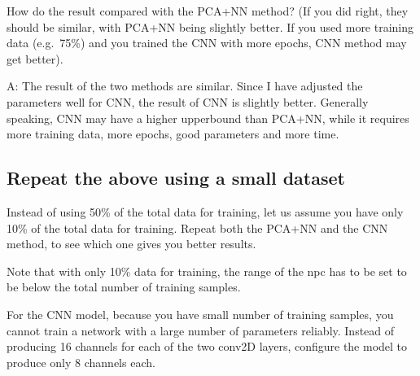 \documentclass[11pt]{article}
\begin{document}
    How do the result compared with the PCA+NN method? (If you did right,
they should be similar, with PCA+NN being slightly better. If you used
more training data (e.g.~75\%) and you trained the CNN with more epochs,
CNN method may get better).

    A: The result of the two methods are similar. Since I have adjusted the
parameters well for CNN, the result of CNN is slightly better. Generally
speaking, CNN may have a higher upperbound than PCA+NN, while it
requires more training data, more epochs, good parameters and more time.

    \hypertarget{repeat-the-above-using-a-small-dataset}{%
\subsection{Repeat the above using a small
dataset}\label{repeat-the-above-using-a-small-dataset}}

Instead of using 50\% of the total data for training, let us assume you
have only 10\% of the total data for training. Repeat both the PCA+NN
and the CNN method, to see which one gives you better results.

Note that with only 10\% data for training, the range of the npc has to
be set to be below the total number of training samples.

For the CNN model, because you have small number of training samples,
you cannot train a network with a large number of parameters reliably.
Instead of producing 16 channels for each of the two conv2D layers,
configure the model to produce only 8 channels each.
\end{document}
